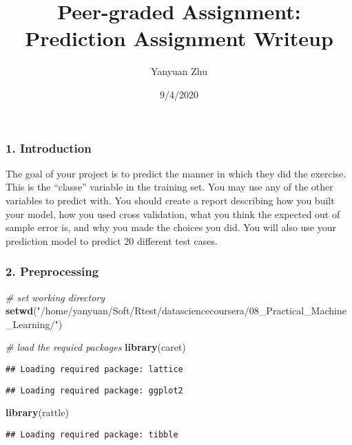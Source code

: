 \documentclass[
]{article}
\title{Peer-graded Assignment: Prediction Assignment Writeup}
\author{Yanyuan Zhu}
\date{9/4/2020}
\newenvironment{Shaded}{\begin{snugshade}}{\end{snugshade}}
\newcommand{\CommentTok}[1]{\textcolor[rgb]{0.56,0.35,0.01}{\textit{#1}}}
\newcommand{\KeywordTok}[1]{\textcolor[rgb]{0.13,0.29,0.53}{\textbf{#1}}}
\newcommand{\NormalTok}[1]{#1}
\newcommand{\StringTok}[1]{\textcolor[rgb]{0.31,0.60,0.02}{#1}}
\begin{document}
\maketitle

\hypertarget{introduction}{%
\subsubsection{1. Introduction}\label{introduction}}

The goal of your project is to predict the manner in which they did the
exercise. This is the ``classe'' variable in the training set. You may
use any of the other variables to predict with. You should create a
report describing how you built your model, how you used cross
validation, what you think the expected out of sample error is, and why
you made the choices you did. You will also use your prediction model to
predict 20 different test cases.

\hypertarget{preprocessing}{%
\subsubsection{2. Preprocessing}\label{preprocessing}}

\begin{Shaded}
\begin{Highlighting}[]
\CommentTok{# set working directory}
\KeywordTok{setwd}\NormalTok{(}\StringTok{"/home/yanyuan/Soft/Rtest/datasciencecoursera/08_Practical_Machine_Learning/"}\NormalTok{)}

\CommentTok{# load the requied packages}
\KeywordTok{library}\NormalTok{(caret)}
\end{Highlighting}
\end{Shaded}

\begin{verbatim}
## Loading required package: lattice
\end{verbatim}

\begin{verbatim}
## Loading required package: ggplot2
\end{verbatim}

\begin{Shaded}
\begin{Highlighting}[]
\KeywordTok{library}\NormalTok{(rattle)}
\end{Highlighting}
\end{Shaded}

\begin{verbatim}
## Loading required package: tibble
\end{verbatim}
\end{document}
